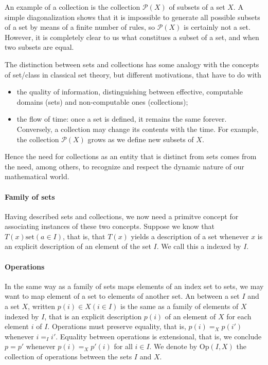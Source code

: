 An example of a collection is the collection $\mathcal{P}(X)$ of subsets of a
set $X$. A simple diagonalization shows that it is impossible to generate all
possible subsets of a set by means of a finite number of rules, so
$\mathcal{P}(X)$ is certainly not a set. However, it is completely clear to us
what constitues a subset of a set, and when two subsets are equal.

The distinction between sets and collections has some analogy with the concepts
of set/class in classical set theory, but different motivations, that have to do
with

\begin{itemize}
\item the quality of information, distinguishing between effective, computable
  domains (sets) and non-computable ones (collections);
\item the flow of time: once a set is defined, it remains the same
  forever. Conversely, a collection may change its contents with the time. For
  example, the collection $\mathcal{P}(X)$ grows as we define new subsets of
  $X$.
\end{itemize}

Hence the need for collections as an entity that is distinct from sets comes
from the need, among others, to recognize and respect the dynamic nature of our
mathematical world.

\paragraph{Family of sets}

Having described sets and collections, we now need a primitve concept for
associating instances of these two concepts. Suppose we know that $T(x)
\text{set} (a \in I)$, that is, that $T(x)$ yields a description of a set
whenever $x$ is an explicit description of an element of the set $I$. We call
this a  indexed by $I$.

\paragraph{Operations}

In the same way as a family of sets maps elements of an index set to sets, we
may want to map element of a set to elements of another set. An
 between a set $I$ and a set $X$, written
$p(i) \in X (i \in I)$ is the same as a family of elements of $X$ indexed by
$I$, that is an explicit description $p(i)$ of an element of $X$ for each
element $i$ of $I$. Operations must preserve equality, that is, $p(i) =_X p(i')$
whenever $i =_I i'$.
Equality between operations is extensional, that is, we conclude $p = p'$
whenever $p(i) =_X p'(i)$ for all $i \in I$.
We denote by $\mathrm{Op}(I,X)$ the collection of operations between the sets
$I$ and $X$.

